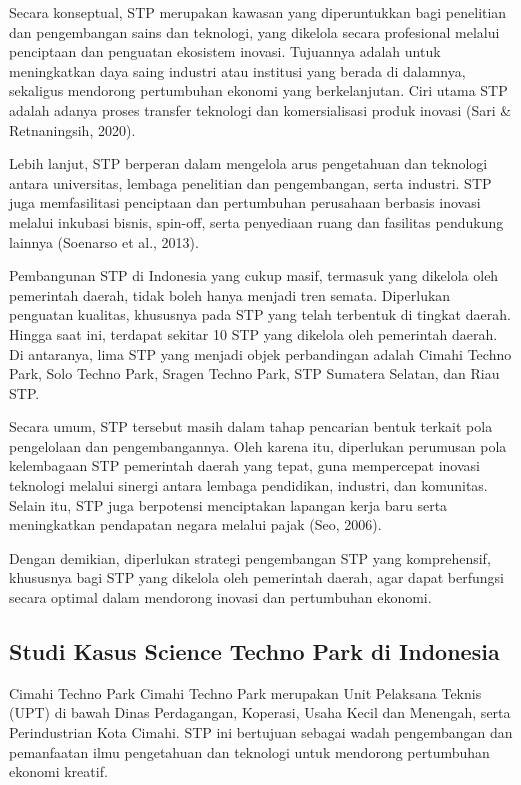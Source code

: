 \documentclass[../wastek.tex]{subfiles}
\begin{document}
Secara konseptual, STP merupakan kawasan yang diperuntukkan bagi penelitian dan pengembangan sains dan teknologi, yang dikelola secara profesional melalui penciptaan dan penguatan ekosistem inovasi. Tujuannya adalah untuk meningkatkan daya saing industri atau institusi yang berada di dalamnya, sekaligus mendorong pertumbuhan ekonomi yang berkelanjutan. Ciri utama STP adalah adanya proses transfer teknologi dan komersialisasi produk inovasi (Sari \& Retnaningsih, 2020).

Lebih lanjut, STP berperan dalam mengelola arus pengetahuan dan teknologi antara universitas, lembaga penelitian dan pengembangan, serta industri. STP juga memfasilitasi penciptaan dan pertumbuhan perusahaan berbasis inovasi melalui inkubasi bisnis, spin-off, serta penyediaan ruang dan fasilitas pendukung lainnya (Soenarso et al., 2013).

Pembangunan STP di Indonesia yang cukup masif, termasuk yang dikelola oleh pemerintah daerah, tidak boleh hanya menjadi tren semata. Diperlukan penguatan kualitas, khususnya pada STP yang telah terbentuk di tingkat daerah. Hingga saat ini, terdapat sekitar 10 STP yang dikelola oleh pemerintah daerah. Di antaranya, lima STP yang menjadi objek perbandingan adalah Cimahi Techno Park, Solo Techno Park, Sragen Techno Park, STP Sumatera Selatan, dan Riau STP.

Secara umum, STP tersebut masih dalam tahap pencarian bentuk terkait pola pengelolaan dan pengembangannya. Oleh karena itu, diperlukan perumusan pola kelembagaan STP pemerintah daerah yang tepat, guna mempercepat inovasi teknologi melalui sinergi antara lembaga pendidikan, industri, dan komunitas. Selain itu, STP juga berpotensi menciptakan lapangan kerja baru serta meningkatkan pendapatan negara melalui pajak (Seo, 2006).

Dengan demikian, diperlukan strategi pengembangan STP yang komprehensif, khususnya bagi STP yang dikelola oleh pemerintah daerah, agar dapat berfungsi secara optimal dalam mendorong inovasi dan pertumbuhan ekonomi.


\subsection{Studi Kasus Science Techno Park di Indonesia}%
\label{sub:studi_kasus_science_techno_park_di_indonesia}

\tabitem Cimahi Techno Park
Cimahi Techno Park merupakan Unit Pelaksana Teknis (UPT) di bawah Dinas Perdagangan, Koperasi, Usaha Kecil dan Menengah, serta Perindustrian Kota Cimahi. STP ini bertujuan sebagai wadah pengembangan dan pemanfaatan ilmu pengetahuan dan teknologi untuk mendorong pertumbuhan ekonomi kreatif.
\end{document}
